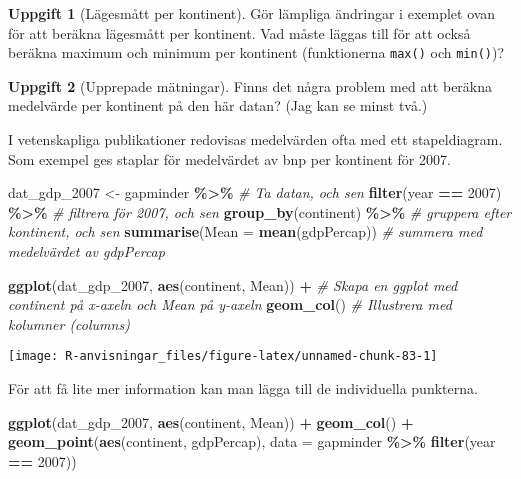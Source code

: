 \documentclass[
]{book}
\newenvironment{Shaded}{\begin{snugshade}}{\end{snugshade}}
\newcommand{\AttributeTok}[1]{\textcolor[rgb]{0.13,0.29,0.53}{#1}}
\newcommand{\CommentTok}[1]{\textcolor[rgb]{0.56,0.35,0.01}{\textit{#1}}}
\newcommand{\DecValTok}[1]{\textcolor[rgb]{0.00,0.00,0.81}{#1}}
\newcommand{\FunctionTok}[1]{\textcolor[rgb]{0.13,0.29,0.53}{\textbf{#1}}}
\newcommand{\NormalTok}[1]{#1}
\newcommand{\OtherTok}[1]{\textcolor[rgb]{0.56,0.35,0.01}{#1}}
\newcommand{\SpecialCharTok}[1]{\textcolor[rgb]{0.81,0.36,0.00}{\textbf{#1}}}
\theoremstyle{definition}
\theoremstyle{definition}
\theoremstyle{definition}
\newtheorem{exercise}{Uppgift}[chapter]
\theoremstyle{definition}
\theoremstyle{remark}
\begin{document}
\begin{exercise}[Lägesmått per kontinent]
Gör lämpliga ändringar i exemplet ovan för att beräkna lägesmått per kontinent. Vad måste läggas till för att också beräkna maximum och minimum per kontinent (funktionerna \texttt{max()} och \texttt{min()})?
\end{exercise}

\begin{exercise}[Upprepade mätningar]
Finns det några problem med att beräkna medelvärde per kontinent på den här datan? (Jag kan se minst två.)
\end{exercise}

I vetenskapliga publikationer redovisas medelvärden ofta med ett stapeldiagram. Som exempel ges staplar för medelvärdet av bnp per kontinent för 2007.

\begin{Shaded}
\begin{Highlighting}[]
\NormalTok{dat\_gdp\_2007 }\OtherTok{\textless{}{-}}\NormalTok{ gapminder }\SpecialCharTok{\%\textgreater{}\%}                    \CommentTok{\# Ta datan, och sen}
  \FunctionTok{filter}\NormalTok{(year }\SpecialCharTok{==} \DecValTok{2007}\NormalTok{) }\SpecialCharTok{\%\textgreater{}\%}                       \CommentTok{\# filtrera för 2007, och sen}
  \FunctionTok{group\_by}\NormalTok{(continent) }\SpecialCharTok{\%\textgreater{}\%}                        \CommentTok{\# gruppera efter kontinent, och sen}
  \FunctionTok{summarise}\NormalTok{(}\AttributeTok{Mean =} \FunctionTok{mean}\NormalTok{(gdpPercap))              }\CommentTok{\# summera med medelvärdet av gdpPercap}

\FunctionTok{ggplot}\NormalTok{(dat\_gdp\_2007, }\FunctionTok{aes}\NormalTok{(continent, Mean)) }\SpecialCharTok{+}     \CommentTok{\# Skapa en ggplot med continent på x{-}axeln och Mean på y{-}axeln}
  \FunctionTok{geom\_col}\NormalTok{()                                     }\CommentTok{\# Illustrera med kolumner (columns)}
\end{Highlighting}
\end{Shaded}

\begin{center}\texttt{[image: R-anvisningar\_files/figure-latex/unnamed-chunk-83-1]} \end{center}

För att få lite mer information kan man lägga till de individuella punkterna.

\begin{Shaded}
\begin{Highlighting}[]
\FunctionTok{ggplot}\NormalTok{(dat\_gdp\_2007, }\FunctionTok{aes}\NormalTok{(continent, Mean)) }\SpecialCharTok{+}
  \FunctionTok{geom\_col}\NormalTok{() }\SpecialCharTok{+}
  \FunctionTok{geom\_point}\NormalTok{(}\FunctionTok{aes}\NormalTok{(continent, gdpPercap), }\AttributeTok{data =}\NormalTok{ gapminder }\SpecialCharTok{\%\textgreater{}\%} \FunctionTok{filter}\NormalTok{(year }\SpecialCharTok{==} \DecValTok{2007}\NormalTok{))}
\end{Highlighting}
\end{Shaded}
\end{document}
